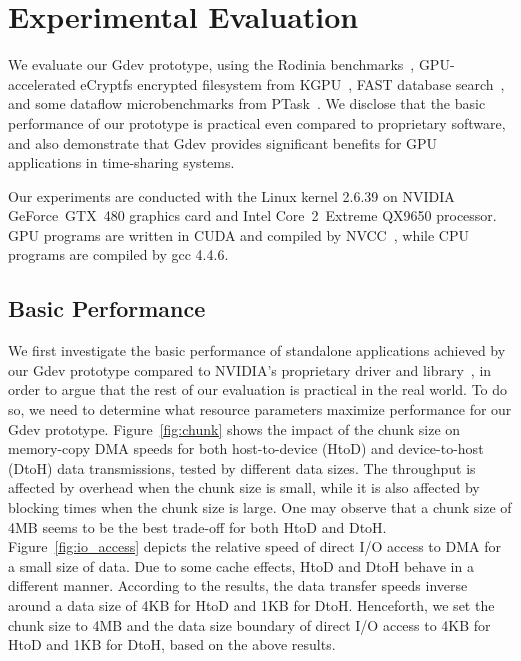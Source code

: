 \section{Experimental Evaluation}
\label{sec:evaluation}

We evaluate our Gdev prototype, using the Rodinia
benchmarks~\cite{Che_IISWC09}, GPU-accelerated eCryptfs encrypted
filesystem from KGPU~\cite{Sun_SECURITY11_Poster}, FAST database
search~\cite{Kim_SIGMOD10}, and some dataflow
microbenchmarks from PTask~\cite{Rossbach_SOSP11}.
We disclose that the basic performance of our prototype is practical
even compared to proprietary software, and also demonstrate that Gdev
provides significant benefits for GPU applications in time-sharing
systems.

Our experiments are conducted with the Linux kernel 2.6.39 on NVIDIA
GeForce~GTX~480 graphics card and Intel Core~2~Extreme QX9650 processor.
GPU programs are written in CUDA and compiled by NVCC~\cite{CUDA40},
while CPU programs are compiled by gcc 4.4.6.

\subsection{Basic Performance}

We first investigate the basic performance of standalone applications achieved
by our Gdev prototype compared to NVIDIA's proprietary driver and
library~\cite{BLOB,CUDA40}, in order to argue that the rest of our
evaluation is practical in the real world. 
To do so, we need to determine what resource parameters maximize
performance for our Gdev prototype.
Figure~\ref{fig:chunk} shows the impact of the chunk size on memory-copy
DMA speeds for both host-to-device (HtoD) and device-to-host (DtoH)
data transmissions, tested by different data sizes.
The throughput is affected by overhead when the chunk size is small,
while it is also affected by blocking times when the chunk size is
large.
One may observe that a chunk size of 4MB seems to be the best trade-off
for both HtoD and DtoH.
Figure~\ref{fig:io_access} depicts the relative speed of direct I/O
access to DMA for a small size of data. 
Due to some cache effects, HtoD and DtoH behave in a different manner.
According to the results, the data transfer speeds inverse around a
data size of 4KB for HtoD and 1KB for DtoH.
Henceforth, we set the chunk size to 4MB and the data size boundary of
direct I/O access to 4KB for HtoD and 1KB for DtoH, based on the above
results. 

